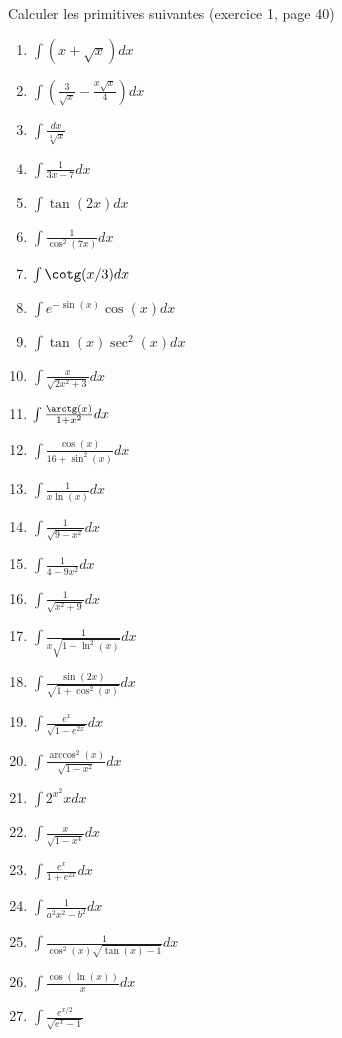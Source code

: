 \begin{exercice}\label{exoGeneral0017}

Calculer les primitives suivantes (exercice 1, page 40)
\renewcommand{\theenumi}{\arabic{enumi}}
\begin{multicols}{3}
\begin{enumerate}
\item
$\int (x+\sqrt{x})dx$
\item
$\int \left( \frac{ 3 }{ \sqrt{x} }-\frac{ x\sqrt{x} }{ 4 } \right) dx$
\item
$\int \frac{ dx }{ \sqrt[4]{x} }$
\item
$\int \frac{1}{ 3x-7 } dx$
\item
$\int \tan(2x) dx$
\item
$\int \frac{1}{ \cos^2(7x) } dx$
\item
$\int \cotg(x/3) dx$
\item
$\int  e^{-\sin(x)}\cos(x) dx$
\item
$\int \tan(x)\sec^2(x) dx$
\item
$\int \frac{ x }{ \sqrt{2x^2+3} } dx$
\item
$\int \frac{ \arctg(x) }{ 1+x^2 } dx$
\item
$\int \frac{ \cos(x) }{ 16+\sin^2(x) } dx$
\item
$\int \frac{1}{ x\ln(x) } dx$
\item
$\int \frac{1}{ \sqrt{9-x^2} } dx$
\item
$\int \frac{1}{ 4-9x^2 } dx$
\item
$\int \frac{1}{ \sqrt{x^2+9} } dx$
\item
$\int \frac{ 1 }{ x\sqrt{1-\ln^2(x)} } dx$
\item
$\int \frac{ \sin(2x) }{ \sqrt{1+\cos^2(x)} } dx$
\item
$\int \frac{ e^x }{ \sqrt{1- e^{2x}} } dx$
\item
$\int \frac{ \arccos^2(x) }{ \sqrt{1-x^2} } dx$
\item
$\int 2^{x^2}x dx$
\item
$\int \frac{ x }{ \sqrt{1-x^4} } dx$
\item
$\int \frac{ e^x }{ 1+ e^{2x} } dx$
\item
$\int \frac{1}{ a^2x^2-b^2 } dx$
\item
$\int \frac{1}{ \cos^2(x)\sqrt{\tan(x)-1} } dx$
\item
$\int \frac{ \cos(\ln(x))}{ x } dx$
\item
$\int \frac{  e^{x/2} }{ \sqrt{e^x-1} }$


\end{enumerate}
\end{multicols}
\end{exercice}
